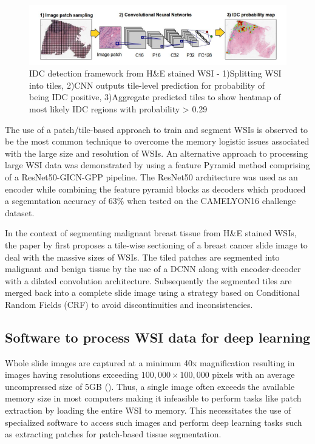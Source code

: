 \documentclass{l4proj}
\begin{document}
\begin{figure}[h]
    \centering
    \includegraphics{images/Cruz-Roa-Ductal-Carcinoma-example.png}
    \caption{IDC detection framework from H\&E stained WSI - 1)Splitting WSI into tiles, 2)CNN outputs tile-level prediction for probability of being IDC positive, 3)Aggregate predicted tiles to show heatmap of most likely IDC regions with probability > 0.29}
    \label{fig:ductal-carcinoma-figure}
\end{figure}

The use of a patch/tile-based approach to train and segment WSIs is observed to be the most common technique to overcome the memory logistic issues associated with the large size and resolution of WSIs. An alternative approach to processing large WSI data was demonstrated by \cite{qin2018large} using a feature Pyramid method comprising of a ResNet50-GICN-GPP pipeline. The ResNet50 architecture was used as an encoder while combining the feature pyramid blocks as decoders which produced a segemntation accuracy of 63\% when tested on the CAMELYON16 challenge dataset. 

In the context of segmenting malignant breast tissue from H\&E stained WSIs, the paper by \cite{priego2020automatic} first proposes a tile-wise sectioning of a breast cancer slide image to deal with the massive sizes of WSIs. The tiled patches are segmented into malignant and benign tissue by the use of a DCNN along with encoder-decoder with a dilated convolution architecture. Subsequently the segmented tiles are merged back into a complete slide image using a strategy based on Conditional Random Fields (CRF) to avoid discontinuities and inconsistencies. 

\subsection{Software to process WSI data for deep learning}
Whole slide images are captured at a minimum 40x magnification resulting in images having resolutions exceeding \(100,000 \times 100,000\) pixels with an average uncompressed size of 5GB (\cite{bandi2018detection}). Thus, a single image often exceeds the available memory size in most computers making it infeasible to perform tasks like patch extraction by loading the entire WSI to memory. This necessitates the use of specialized software to access such images and perform deep learning tasks such as extracting patches for patch-based tissue segmentation.
\end{document}
